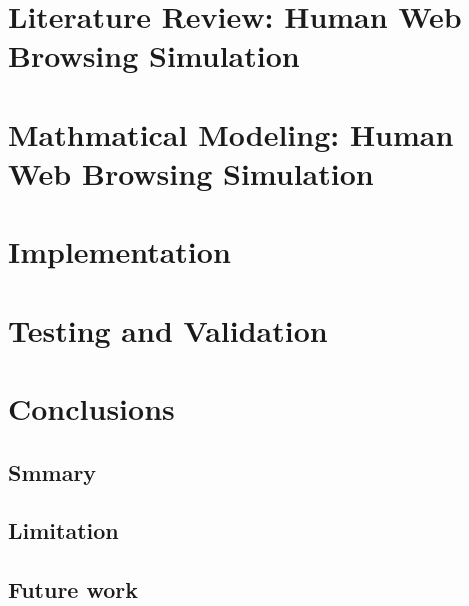 \documentclass[12pt]{report}
\begin{document}
\chapter{Literature Review: Human Web Browsing Simulation} \label{lr:hwbs}

\chapter{Mathmatical Modeling: Human Web Browsing Simulation} \label{mm}

\chapter{Implementation} \label{imp}

\chapter{Testing and Validation} \label{tv}

\chapter{Conclusions}
\section{Smmary}
\section{Limitation}
\section{Future work}





\end{document}
